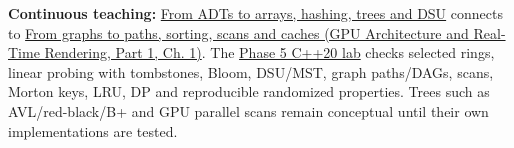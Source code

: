 \textbf{Continuous teaching:} \hyperref[01-foundations-i-ch007-the-scene-is-now-too-large-for-the-wrong-container-phase-5-m025m027-parts-401445]{From ADTs to arrays, hashing, trees and DSU} connects to \href{../06-GPU-Architecture-and-Real-Time-Rendering-P01/main.pdf\#nameddest=01-foundations-i-ch008-from-an-asset-map-to-a-correct-navigable-world-phase-5-m028m030-parts-446500}{From graphs to paths, sorting, scans and caches (GPU Architecture and Real-Time Rendering, Part 1, Ch. 1)}. The \hyperref[source-file-0ec69e1a1a11439bca29faa5]{Phase 5 C++20 lab} checks selected rings, linear probing with tombstones, Bloom, DSU/MST, graph paths/DAGs, scans, Morton keys, LRU, DP and reproducible randomized properties. Trees such as AVL/red-black/B+ and GPU parallel scans remain conceptual until their own implementations are tested.

